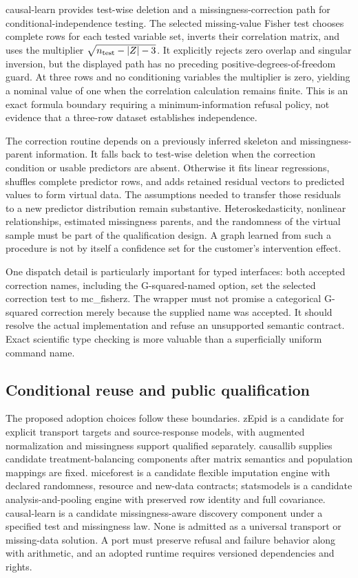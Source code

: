 causal-learn provides test-wise deletion and a missingness-correction path for conditional-independence testing. The selected missing-value Fisher test chooses complete rows for each tested variable set, inverts their correlation matrix, and uses the multiplier $\sqrt{n_{\rm test}-|Z|-3}$. It explicitly rejects zero overlap and singular inversion, but the displayed path has no preceding positive-degrees-of-freedom guard. At three rows and no conditioning variables the multiplier is zero, yielding a nominal value of one when the correlation calculation remains finite. This is an exact formula boundary requiring a minimum-information refusal policy, not evidence that a three-row dataset establishes independence.\citep{exec25_ptm_causallearn,exec25_ptm_choice}

The correction routine depends on a previously inferred skeleton and missingness-parent information. It falls back to test-wise deletion when the correction condition or usable predictors are absent. Otherwise it fits linear regressions, shuffles complete predictor rows, and adds retained residual vectors to predicted values to form virtual data. The assumptions needed to transfer those residuals to a new predictor distribution remain substantive. Heteroskedasticity, nonlinear relationships, estimated missingness parents, and the randomness of the virtual sample must be part of the qualification design. A graph learned from such a procedure is not by itself a confidence set for the customer's intervention effect.\citep{exec25_ptm_causallearn}

One dispatch detail is particularly important for typed interfaces: both accepted correction names, including the G-squared-named option, set the selected correction test to mc\_fisherz. The wrapper must not promise a categorical G-squared correction merely because the supplied name was accepted. It should resolve the actual implementation and refuse an unsupported semantic contract. Exact scientific type checking is more valuable than a superficially uniform command name.\citep{exec25_ptm_causallearn}

\subsection{Conditional reuse and public qualification}

The proposed adoption choices follow these boundaries. zEpid is a candidate for explicit transport targets and source-response models, with augmented normalization and missingness support qualified separately. causallib supplies candidate treatment-balancing components after matrix semantics and population mappings are fixed. miceforest is a candidate flexible imputation engine with declared randomness, resource and new-data contracts; statsmodels is a candidate analysis-and-pooling engine with preserved row identity and full covariance. causal-learn is a candidate missingness-aware discovery component under a specified test and missingness law. None is admitted as a universal transport or missing-data solution. A port must preserve refusal and failure behavior along with arithmetic, and an adopted runtime requires versioned dependencies and rights.\citep{exec25_ptm_choice}

